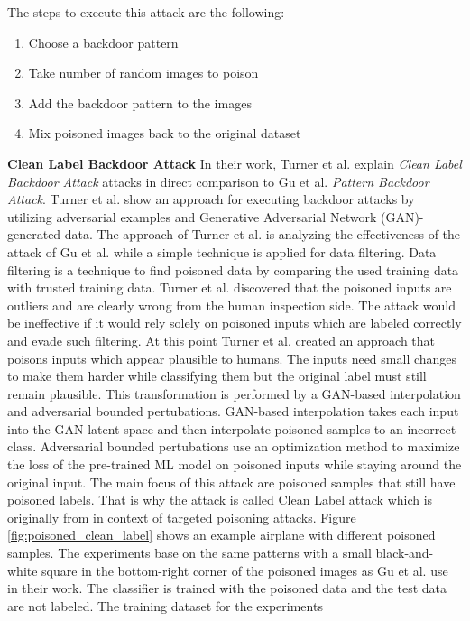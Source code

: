The steps to execute this attack are the following:

\begin{enumerate}
  \item Choose a backdoor pattern
  \item Take number of random images to poison
  \item Add the backdoor pattern to the images
  \item Mix poisoned images back to the original dataset
\end{enumerate}

\textbf{Clean Label Backdoor Attack} In their work, Turner et al. \cite{turner2018clean} explain \textit{Clean Label Backdoor Attack} attacks in direct comparison to Gu et al. \textit{Pattern Backdoor Attack}. Turner et al. show an approach for executing backdoor attacks by utilizing adversarial examples and Generative Adversarial Network (GAN)-generated data. The approach of Turner et al. is analyzing the effectiveness of the attack of Gu et al. while a simple technique is applied for data filtering. Data filtering is a technique to find poisoned data by comparing the used training data with trusted training data. Turner et al. discovered that the poisoned inputs are outliers and are clearly wrong from the human inspection side. The attack would be ineffective if it would rely solely on poisoned inputs which are labeled correctly and evade such filtering. At this point Turner et al. created an approach that poisons inputs which appear plausible to humans. The inputs need small changes to make them harder while classifying them but the original label must still remain plausible. This transformation is performed by a GAN-based interpolation and adversarial bounded pertubations. GAN-based interpolation takes each input into the GAN latent space \cite{DBLP:conf/nips/GoodfellowPMXWOCB14} and then interpolate poisoned samples to an incorrect class. Adversarial bounded pertubations use an optimization method to maximize the loss of the pre-trained ML model on poisoned inputs while staying around the original input. The main focus of this attack are poisoned samples that still have poisoned labels. That is why the attack is called Clean Label attack which is originally from \cite{DBLP:journals/corr/abs-1804-00792} in context of targeted poisoning attacks. Figure \ref{fig:poisoned_clean_label} shows an example airplane with different poisoned samples. The experiments base on the same patterns with a small black-and-white square in the bottom-right corner of the poisoned images as Gu et al. use in their work. The classifier is trained with the poisoned data and the test data are not labeled. The training dataset for the experiments
